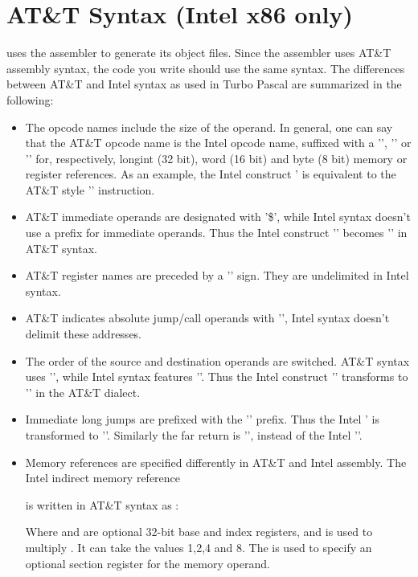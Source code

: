 \documentclass{report}
\begin{document}
\section{AT\&T Syntax (Intel x86 only) }
\label{se:AttSyntax}
\fpc uses the \gnu {} assembler to generate its object files. Since
the \gnu assembler uses AT\&T assembly syntax, the code you write should
use the same syntax. The differences between AT\&T and Intel syntax as used
in Turbo Pascal are summarized in the following:
\begin{itemize}
\item The opcode names include the size of the operand. In general, one can
say that the AT\&T opcode name is the Intel opcode name, suffixed with a
'', '' or '' for, respectively, longint (32 bit),
word (16 bit) and byte (8 bit) memory or register references. As an example,
the Intel construct \mbox{'} is equivalent to the AT\&T style '' instruction.
\item AT\&T immediate operands are designated with '\$', while Intel syntax
doesn't use a prefix for immediate operands. Thus the Intel construct
'' becomes '' in AT\&T syntax.
\item AT\&T register names are preceded by a '\var{\%}' sign. 
They are undelimited in Intel syntax. 
\item AT\&T indicates absolute jump/call operands with '\var{*}', Intel
syntax doesn't delimit these addresses.
\item The order of the source and destination operands are switched. AT\&T
syntax uses '', while Intel syntax features ''. Thus the Intel construct '' transforms to
'' in the AT\&T dialect.
\item Immediate long jumps are prefixed with the '' prefix. Thus the
Intel ' is transformed to ''. Similarly the far return is '', instead of the
Intel ''.
\item Memory references are specified differently in AT\&T and Intel
assembly. The Intel indirect memory reference
\begin{quote}
\end{quote}
is written in AT\&T syntax as :
\begin{quote}
\end{quote}
Where  and  are optional 32-bit base and index
registers, and  is used to multiply . It can take the
values 1,2,4 and 8. The  is used to specify an optional section
register for the memory operand.
\end{itemize}
\end{document}
